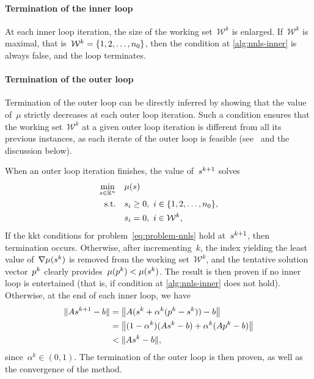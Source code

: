 \paragraph{Termination of the inner loop}

At each inner loop iteration, the size of the working set~$\mathcal{W}^k$ is enlarged.
If~$\mathcal{W}^k$ is maximal, that is~$\mathcal{W}^k = \{1, 2, \dots, n_0\}$, then the condition at \cref{alg:nnls-inner} is always false, and the loop terminates.

\paragraph{Termination of the outer loop}

Termination of the outer loop can be directly inferred by showing that the value of~$\mu$ strictly decreases at each outer loop iteration.
Such a condition ensures that the working set~$\mathcal{W}^k$ at a given outer loop iteration is different from all its previous instances, as each iterate of the outer loop is feasible (see~\cite[Lem.~23.17]{Lawson_Hanson_1987} and the discussion below).

When an outer loop iteration finishes, the value of~$\sstep[k + 1]$ solves
\begin{align*}
    \min_{\sstep \in \R^n}  & \quad \mu(\sstep)\\
    \text{s.t.}             & \quad \sstep_i \ge 0, ~ i \in \set{1, 2, \dots, n_0},\\
                            & \quad \sstep_i = 0, ~ i \in \mathcal{W}^k,
\end{align*}
If the \gls{kkt} conditions for problem~\cref{eq:problem-nnls} hold at~$\sstep[k + 1]$, then termination occurs.
Otherwise, after incrementing~$k$, the index yielding the least value of~$\nabla \mu(\sstep[k])$ is removed from the working set~$\mathcal{W}^k$, and the tentative solution vector~$\pstep[k]$ clearly provides~$\mu(\pstep[k]) < \mu(\sstep[k])$.
The result is then proven if no inner loop is entertained (that is, if condition at \cref{alg:nnls-inner} does not hold).
Otherwise, at the end of each inner loop, we have
\begin{align*}
    \norm{A \sstep[k + 1] - b}  & = \norm[\big]{A (\sstep[k] + \alpha^k (\pstep[k] - \sstep[k])) - b}\\
                                & = \norm[\big]{(1 - \alpha^k) (A \sstep[k] - b) + \alpha^k (A \pstep[k] - b)}\\
                                & < \norm{A \sstep[k] - b},
\end{align*}
since~$\alpha^k \in (0, 1)$.
The termination of the outer loop is then proven, as well as the convergence of the method.

